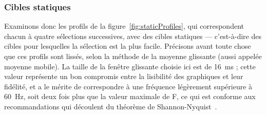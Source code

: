 	\subsubsection{Cibles statiques}
	Examinons donc les profils de la figure~\ref{fig:staticProfiles}, qui correspondent chacun à quatre sélections successives, avec des cibles statiques --- c'est-à-dire des cibles pour lesquelles la sélection est la plus facile. Précisons avant toute chose que ces profils sont lissés, selon la méthode de la moyenne glissante (aussi appelée moyenne mobile). La taille de la fenêtre glissante choisie ici est de 16~ms ; cette valeur représente un bon compromis entre la lisibilité des graphiques et leur fidélité, et a le mérite de correspondre à une fréquence légèrement supérieure à 60~Hz, soit deux fois plus que la valeur maximale de F, ce qui est conforme aux recommandations qui découlent du théorème de Shannon-Nyquist~\cite{shannon1949communication}.
	
